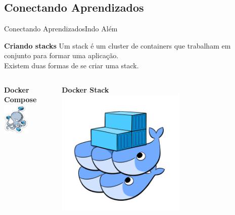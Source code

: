 \documentclass[10pt]{beamer}
\begin{document}
\subsection{Conectando Aprendizados}
\begin{frame}{Conectando Aprendizados}{Indo Além}
    \begin{block}{\textbf{Criando stacks}}
    Um stack é um cluster de containers que trabalham em conjunto para formar uma aplicação.\\
    Existem duas formas de se criar uma stack.\\[.5cm]
    \end{block}
    \pause
    \begin{columns}
    \begin{column}{0.5\textwidth}
        \centering
        \textbf{Docker Compose}\\
        \includegraphics[width=0.5\textwidth]{AAUgraphics/docker_compose.png}
        \pause
    \end{column}
    \begin{column}{0.5\textwidth}  %
        \centering
        \textbf{Docker Stack}\\
        \includegraphics[width=0.6\textwidth]{AAUgraphics/docker_stack.png}
    \end{column}
    \end{columns}
\end{frame}
\end{document}
